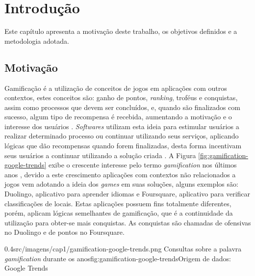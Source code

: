 \chapter[Introdução]{Introdução}
\label{ch:introducao}
\par Este capítulo apresenta a motivação deste trabalho, os objetivos definidos e a metodologia adotada.

\section{Motivação}

\par Gamificação é a utilização de conceitos de jogos em aplicações com outros contextos, estes conceitos são: ganho de pontos, \textit{ranking}, troféus e conquistas, assim como processos que devem ser concluídos, e, quando são finalizados com sucesso, algum tipo de recompensa é recebida, aumentando a motivação e o interesse dos usuários \cite{robson2015all}. \textit{Softwares} utilizam esta ideia para estimular usuários a realizar determinado processo ou continuar utilizando seus serviços, aplicando lógicas que dão recompensas quando forem finalizadas, desta forma incentivam seus usuários a continuar utilizando a solução criada \cite{hamari2014does}. A Figura \ref{fig:gamification-google-trends} exibe o crescente interesse pelo termo \textit{gamification} nos últimos anos \cite{groh2012gamification}, devido a este crescimento aplicações com contextos não relacionados a jogos vem adotando a ideia dos \textit{games} em suas soluções, alguns exemplos são: Duolingo, aplicativo para aprender idiomas e Foursquare, aplicativo para verificar classificações de locais. Estas aplicações possuem fins totalmente diferentes, porém, aplicam lógicas semelhantes de gamificação, que é a continuidade da utilização para obter-se mais conquistas. As conquistas são chamadas de ofensivas no Duolingo e de pontos no Foursquare.

\begin{image}
{0.4}{src/imagens/cap1/gamification-google-trends.png}
{Consultas sobre a palavra \textit{gamification} durante os anos}{fig:gamification-google-trends}{Origem de dados: Google Trends }
\end{image}

